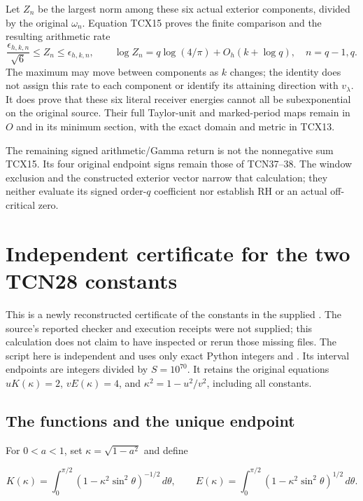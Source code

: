 \documentclass[11pt,a4paper]{article}
\begin{document}
Let $Z_n$ be the largest norm among these six actual exterior
components, divided by the original $\omega_n$. Equation TCX15 proves
the finite comparison and the resulting arithmetic rate
\begin{equation}\tag{TCX16}
 \boxed{\frac{\epsilon_{h,k,n}}{\sqrt6}\le Z_n\le\epsilon_{h,k,n},
 \qquad\log Z_n=q\log(4/\pi)+O_h(k+\log q),
 \quad n=q-1,q.}
\end{equation}
The maximum may move between components as $k$ changes; the identity
does not assign this rate to each component or identify its attaining
direction with $v_\lambda$. It does prove that these six literal
receiver energies cannot all be subexponential on the original source.
Their full Taylor-unit and marked-period maps remain in $O$ and in its
minimum section, with the exact domain and metric in TCX13.

The remaining signed arithmetic/Gamma return is not the nonnegative
sum TCX15. Its four original endpoint signs remain those of TCN37--38.
The window exclusion and the constructed exterior vector narrow that
calculation; they neither evaluate its signed order-$q$ coefficient nor
establish RH or an actual off-critical zero.
\endgroup

\clearpage
\begingroup
\section{Independent certificate for the two TCN28 constants}

This is a newly reconstructed certificate of the constants in the supplied \texttt{}. The source's reported checker and execution receipts were not supplied; this calculation does not claim to have inspected or rerun those missing files. The script here is independent and uses only exact Python integers and \texttt{}. Its interval endpoints are integers divided by $S=10^{70}$. It retains the original equations $uK(\kappa)=2$, $vE(\kappa)=4$, and $\kappa^2=1-u^2/v^2$, including all constants.

\subsection{The functions and the unique endpoint}

For $0<a<1$, set $\kappa=\sqrt{1-a^2}$ and define

\[
 K(\kappa)=\int_0^{\pi/2}(1-\kappa^2\sin^2\theta)^{-1/2}\,d\theta,
 \qquad
 E(\kappa)=\int_0^{\pi/2}(1-\kappa^2\sin^2\theta)^{1/2}\,d\theta.
\]
\end{document}
